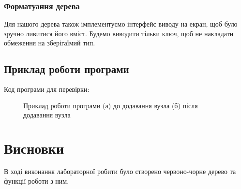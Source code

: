 \subsubsection{Форматуання дерева}
Для нашого дерева також імплементуємо інтерфейс виводу на екран,
щоб було зручно ливитися його вміст.
Будемо виводити тільки ключ, щоб не накладати обмеження на зберігаїмий тип.



\newpage
\subsection{Приклад роботи програми}
\noindent
Код програми для перевірки:


\begin{figure}[ht!]
    \centering
    \caption{Приклад роботи програми  (а) до додавання вузла (б) після додавання вузла}
\end{figure}


\newpage
\section{Висновки}
В ході виконання лабораторної робити було створено червоно-чорне дерево та функції роботи з ним.
